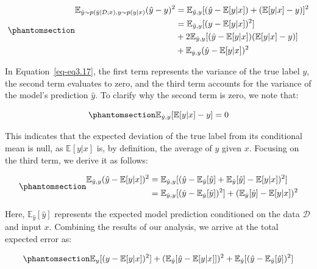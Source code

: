 \documentclass[
  letterpaper,
  numbers=noenddot,
  DIV=11]{scrreprt}
\theoremstyle{definition}
\theoremstyle{plain}
\theoremstyle{plain}
\theoremstyle{remark}
\begin{document}
\begin{equation}\phantomsection\label{eq-eq3.17}{\begin{aligned}
\mathbb{E}_{\hat{y} \sim p(\hat{y} | \mathcal{D}; x), y \sim p(y|x)} (\hat{y} - y)^2 &= \mathbb{E}_{\hat{y}, y}[(\hat{y} - \mathbb{E}[y|x]) + (\mathbb{E}[y|x] - y)]^2 \\
&= \mathbb{E}_{\hat{y}, y} [(y - \mathbb{E}[y|x])^2]\\
&+ 2\mathbb{E}_{\hat{y}, y} [(\hat{y} - \mathbb{E}[y|x])(\mathbb{E}[y|x] - y)]\\
&+ \mathbb{E}_{\hat{y}, y}(\hat{y} - \mathbb{E}[y|x])^2
\end{aligned}}\end{equation}

In Equation~\ref{eq-eq3.17}, the first term represents the variance of
the true label \(y\), the second term evaluates to zero, and the third
term accounts for the variance of the model's prediction \(\hat{y}\). To
clarify why the second term is zero, we note that:

\begin{equation}\phantomsection\label{eq-eq3.18}{
\mathbb{E}_{\hat{y}, y}[\mathbb{E}[y|x] - y] = 0
}\end{equation}

This indicates that the expected deviation of the true label from its
conditional mean is null, as \(\mathbb{E}[y|x]\) is, by definition, the
average of \(y\) given \(x\). Focusing on the third term, we derive it
as follows:

\begin{equation}\phantomsection\label{eq-eq3.19}{\begin{aligned}
\mathbb{E}_{\hat{y}, y}(\hat{y} - \mathbb{E}[y|x])^2 &= \mathbb{E}_{\hat{y}, y}[(\hat{y} - \mathbb{E}_{\hat{y}}[\hat{y}] + \mathbb{E}_{\hat{y}}[\hat{y}] - \mathbb{E}[y|x])^2] \\
&= \mathbb{E}_{\hat{y}, y}[(\hat{y} - \mathbb{E}_{\hat{y}}[\hat{y}])^2] + (\mathbb{E}_{\hat{y}}[\hat{y}] - \mathbb{E}[y|x])^2
\end{aligned}}\end{equation}

Here, \(\mathbb{E}_{\hat{y}}[\hat{y}]\) represents the expected model
prediction conditioned on the data \(\mathcal{D}\) and input \(x\).
Combining the results of our analysis, we arrive at the total expected
error as:

\begin{equation}\phantomsection\label{eq-eq3.20}{
\mathbb{E}_{y} [(y - \mathbb{E}[y|x])^2] + (\mathbb{E}_{\hat{y}} [\hat{y} - \mathbb{E}[y|x]] )^2 + \mathbb{E}_{\hat{y}} [(\hat{y} - \mathbb{E}_{\hat{y}}[\hat{y}])^2]
}\end{equation}
\end{document}
